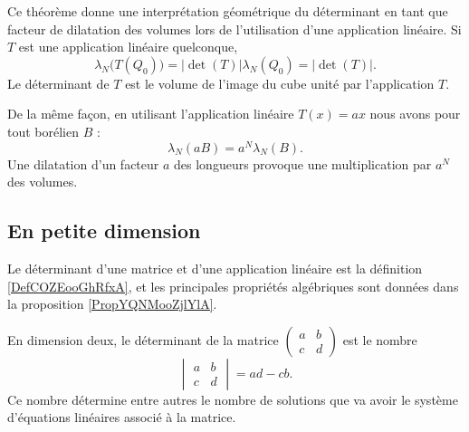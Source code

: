 Ce théorème donne une interprétation géométrique du déterminant en tant que facteur de dilatation des volumes lors de l'utilisation d'une application linéaire. Si \( T\) est une application linéaire quelconque,
\begin{equation}
    \lambda_N\big( T(Q_0) \big)=| \det(T) |\lambda_N(Q_0)=| \det(T) |.
\end{equation}
Le déterminant de \( T\) est le volume de l'image du cube unité par l'application \( T\).

De la même façon, en utilisant l'application linéaire \( T(x)=ax\) nous avons pour tout borélien \( B\) :
\begin{equation}
    \lambda_N(aB)=a^N\lambda_N(B).
\end{equation}
Une dilatation d'un facteur \( a\) des longueurs provoque une multiplication par \( a^N\) des volumes.

\subsection{En petite dimension}

Le déterminant d'une matrice et d'une application linéaire est la définition \ref{DefCOZEooGhRfxA}, et les principales propriétés algébriques sont données dans la proposition \ref{PropYQNMooZjlYlA}.

En dimension deux, le déterminant de la matrice
    $\begin{pmatrix}
        a    &   b    \\ 
        c    &   d    
    \end{pmatrix}$
est le nombre
\begin{equation}
    \begin{vmatrix}
          a  &   b    \\ 
        c    &   d    
    \end{vmatrix}=ad-cb.
\end{equation}
Ce nombre détermine entre autres le nombre de solutions que va avoir le système d'équations linéaires associé à la matrice.

